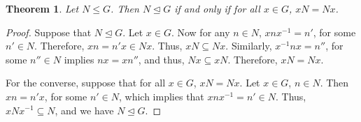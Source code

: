 \documentclass[svgnames]{article}
\newtheorem{Theorem}{Theorem}[section]
\theoremstyle{definition}
\theoremstyle{remark}
\begin{document}
\begin{Theorem}
Let $N \le G$. Then $N \unlhd G$ if and only if for all $x \in G$, $xN = Nx$.
\end{Theorem}

\begin{proof}
Suppose that $N \unlhd G$. Let $x \in G$. Now for any $n \in N$, $xnx^{-1} = n'$, for some $n' \in N$. Therefore, $xn = n'x \in Nx$. Thus, $xN \subseteq Nx$. Similarly, $x^{-1}nx = n''$, for some $n'' \in N$ implies $nx = xn''$, and thus, $Nx \subseteq xN$. Therefore, $xN = Nx$.

For the converse, suppose that for all $x \in G$, $xN = Nx$. Let $x \in G$, $n \in N$. Then $xn = n'x$, for some $n' \in N$, which implies that $xnx^{-1} = n' \in N$. Thus, $xNx^{-1} \subseteq N$, and we have $N \unlhd G$.
\end{proof}
\end{document}
